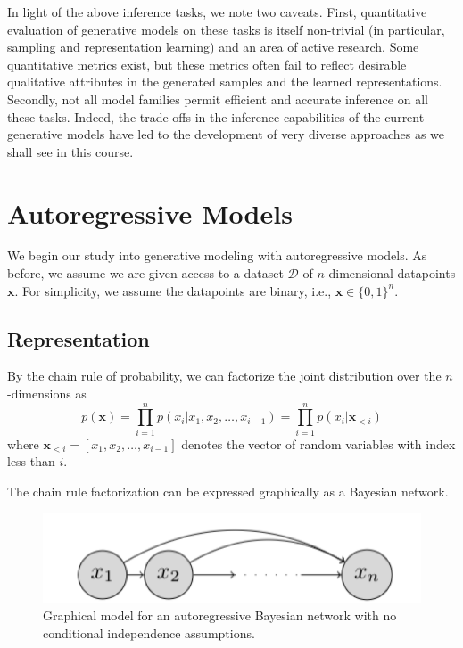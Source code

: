 In light of the above inference tasks, we note two caveats. First,
quantitative evaluation of generative models on these tasks is itself
non-trivial (in particular, sampling and representation learning) and an
area of active research. Some quantitative metrics exist, but these
metrics often fail to reflect desirable qualitative attributes in the
generated samples and the learned representations. Secondly, not all
model families permit efficient and accurate inference on all these
tasks. Indeed, the trade-offs in the inference capabilities of the
current generative models have led to the development of very diverse approaches as
we shall see in this course.


\section{Autoregressive Models}

We begin our study into generative modeling with autoregressive models. As before, 
we assume we are given access to a dataset $\mathcal{D}$ of $n$-dimensional 
datapoints $\mathbf{x}$. For simplicity, we assume the datapoints are binary, i.e., 
$\mathbf{x} \in \{0,1\}^n$.


\subsection{Representation}

By the chain rule of probability, we can factorize the joint distribution over the 
$n$-dimensions as 
\begin{equation}
\label{eq:chain_rule}
p(\mathbf{x}) = \prod\limits_{i=1}^{n}p(x_i \vert x_1, x_2, \ldots, x_{i-1}) = 
\prod\limits_{i=1}^{n} p(x_i \vert \mathbf{x}_{< i } )
\end{equation}
where $\mathbf{x}_{< i}=[x_1, x_2, \ldots, x_{i-1}]$ denotes the vector of random 
variables with index less than $i$. 

The chain rule factorization can be expressed graphically as a Bayesian network.

\begin{figure}[H]
\centering
\includegraphics[scale=0.8]{pix/dgm/autoregressive.png}
\caption{Graphical model for an autoregressive Bayesian network with no 
conditional independence assumptions.}
\end{figure}

